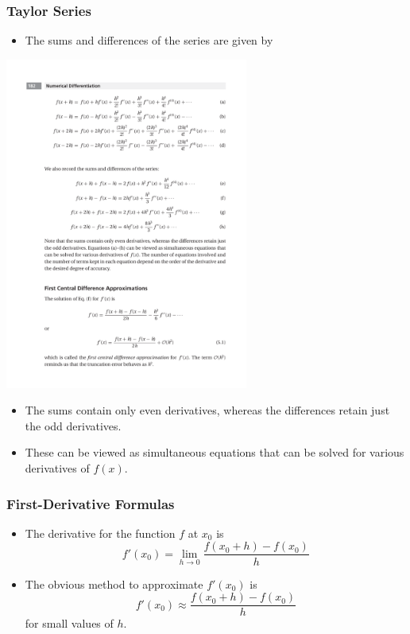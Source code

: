 \documentclass{beamer}
\begin{document}
\begin{frame}[fragile]
\frametitle{Taylor Series}
\begin{itemize}
\item The sums and differences of the series are given by 
\end{itemize}
\centerline{\includegraphics[width=0.6\textwidth]{Lec9_fig2}}
\begin{itemize}
\item The sums contain only \alert{even} derivatives, whereas the differences retain just the \alert{odd} derivatives.
\item These can be viewed as  simultaneous equations that can be solved for various derivatives of $f(x)$.
\end{itemize}
\end{frame}
\begin{frame}[fragile]
\frametitle{First-Derivative Formulas}
\begin{itemize}
\item The derivative for the function $f$ at $x_0$ is 
\[
f'(x_0)=\lim_{h\rightarrow 0} \frac{f(x_0+h)-f(x_0)}{h}
\]
\item The obvious method to approximate $f'(x_0)$ is 
\[
f'(x_0)\approx \frac{f(x_0+h)-f(x_0)}{h}
\]
for small values of $h$.
\end{itemize}
\end{frame}
\end{document}
